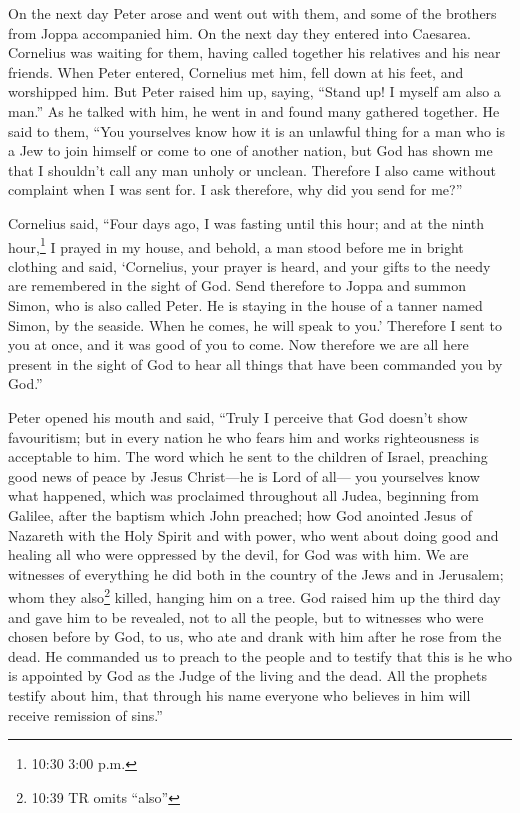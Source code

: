 On the next day Peter arose and went out with them, and some of the
brothers from Joppa accompanied him.  On the next day they
entered into Caesarea. Cornelius was waiting for them, having called
together his relatives and his near friends.  When Peter
entered, Cornelius met him, fell down at his feet, and worshipped him.
 But Peter raised him up, saying, ``Stand up! I myself am
also a man.''  As he talked with him, he went in and found
many gathered together.  He said to them, ``You yourselves
know how it is an unlawful thing for a man who is a Jew to join himself
or come to one of another nation, but God has shown me that I shouldn't
call any man unholy or unclean.  Therefore I also came
without complaint when I was sent for. I ask therefore, why did you send
for me?''

 Cornelius said, ``Four days ago, I was fasting until this
hour; and at the ninth hour,\footnote{10:30 3:00 p.m.} I prayed in my
house, and behold, a man stood before me in bright clothing
 and said, `Cornelius, your prayer is heard, and your gifts
to the needy are remembered in the sight of God.  Send
therefore to Joppa and summon Simon, who is also called Peter. He is
staying in the house of a tanner named Simon, by the seaside. When he
comes, he will speak to you.'  Therefore I sent to you at
once, and it was good of you to come. Now therefore we are all here
present in the sight of God to hear all things that have been commanded
you by God.''

 Peter opened his mouth and said, ``Truly I perceive that
God doesn't show favouritism;  but in every nation he who
fears him and works righteousness is acceptable to him. 
The word which he sent to the children of Israel, preaching good news of
peace by Jesus Christ---he is Lord of all---  you
yourselves know what happened, which was proclaimed throughout all
Judea, beginning from Galilee, after the baptism which John preached;
 how God anointed Jesus of Nazareth with the Holy Spirit
and with power, who went about doing good and healing all who were
oppressed by the devil, for God was with him.  We are
witnesses of everything he did both in the country of the Jews and in
Jerusalem; whom they also\footnote{10:39 TR omits ``also''} killed,
hanging him on a tree.  God raised him up the third day and
gave him to be revealed,  not to all the people, but to
witnesses who were chosen before by God, to us, who ate and drank with
him after he rose from the dead.  He commanded us to preach
to the people and to testify that this is he who is appointed by God as
the Judge of the living and the dead.  All the prophets
testify about him, that through his name everyone who believes in him
will receive remission of sins.''


